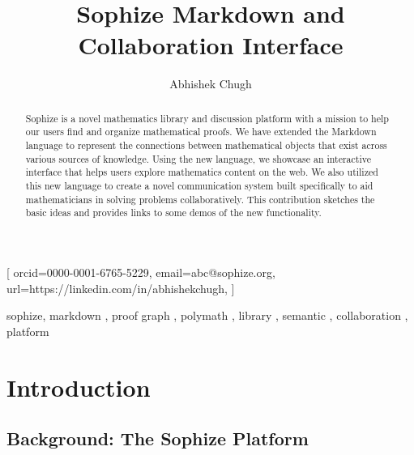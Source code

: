 \documentclass[]{ceurart}
\begin{document}
\graphicspath {{../res}}


\title{Sophize Markdown and Collaboration Interface}

\author{Abhishek Chugh}[%
orcid=0000-0001-6765-5229,
email=abc@sophize.org,
url=https://linkedin.com/in/abhishekchugh,
]
\address{Sophize Foundation, Bengaluru, India}


\begin{abstract}
Sophize is a novel mathematics library and discussion platform with a mission to help our users find and organize mathematical proofs. We have extended the Markdown language to represent the connections between mathematical objects that exist across various sources of knowledge. Using the new language, we showcase an interactive interface that helps users explore mathematics content on the web. We also utilized this new language to create a novel communication system built specifically to aid mathematicians in solving problems collaboratively. This contribution sketches the basic ideas and provides links to some demos of the new functionality.

\end{abstract}

\begin{keywords}
  sophize\sep
  markdown \sep
  proof graph \sep
  polymath \sep
  library \sep
  semantic \sep
  collaboration \sep
  platform
\end{keywords}

\maketitle

\section{Introduction}

\subsection*{Background: The Sophize Platform}
\end{document}
